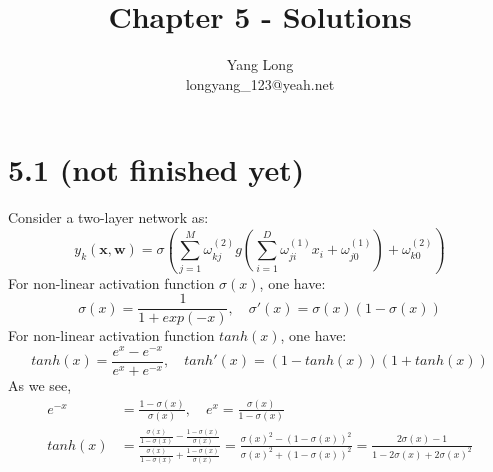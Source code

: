 \documentclass[10pt,a4paper,draft]{book}
\author{Yang Long \\ longyang\_123@yeah.net}
\title{Chapter 5 - Solutions}
\begin{document}
\maketitle
\section*{5.1 (not finished yet)}
Consider a two-layer network as:
\begin{equation}
y_k(\bm{x},\bm{w}) = \sigma \left(\sum_{j=1}^{M} \omega^{(2)}_{kj} g\left(\sum_{i=1}^{D} \omega_{ji}^{(1)}x_i +\omega^{(1)}_{j0}\right)+\omega_{k0}^{(2)}\right)
\end{equation}
For non-linear activation function $\sigma(x)$, one have:
\begin{equation}
\sigma(x)=\frac{1}{1+exp(-x)},\quad \sigma'(x) = \sigma(x)(1-\sigma(x))
\end{equation}
For non-linear activation function $tanh(x)$, one have:
\begin{equation}
tanh(x) = \frac{e^x - e^{-x}}{e^x + e^{-x}}, \quad tanh'(x) = (1 - tanh(x))(1+tanh(x))
\end{equation}
As we see,
\begin{equation}
\begin{aligned}
e^{-x} &= \frac{1-\sigma(x)}{\sigma(x)}, \quad e^x = \frac{\sigma(x)}{1-\sigma(x)} \\
tanh(x) &= \frac{\frac{\sigma(x)}{1-\sigma(x)} - \frac{1-\sigma(x)}{\sigma(x)}}{\frac{\sigma(x)}{1-\sigma(x)} +\frac{1-\sigma(x)}{\sigma(x)}} = \frac{\sigma(x)^2 - (1-\sigma(x))^2}{\sigma(x)^2 + (1-\sigma(x))^2} = \frac{2\sigma(x)-1}{1-2\sigma(x)+2\sigma(x)^2}
\end{aligned}
\end{equation}
\end{document}
